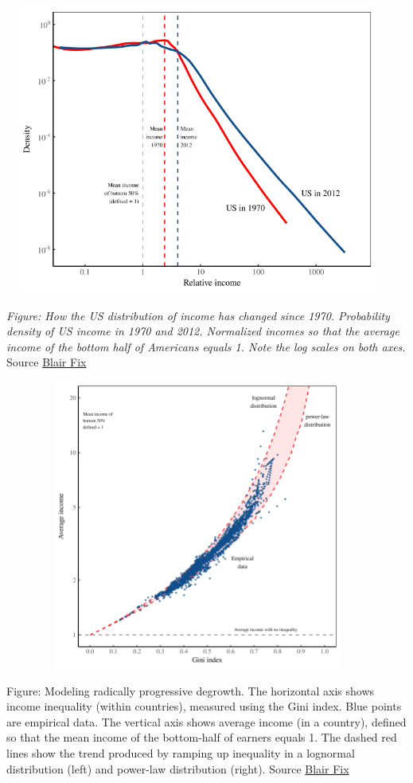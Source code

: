 \documentclass[
]{book}
\begin{document}
\includegraphics[width=5in,height=3.75in]{fig/fix_inequality.png}

\emph{Figure: How the US distribution of income has changed since 1970.
Probability density of US income in 1970 and 2012.
Normalized incomes so that the average income of the bottom half of Americans equals 1.
Note the log scales on both axes.}
Source \href{https://economicsfromthetopdown.com/2021/02/26/radically-progressive-degrowth-reducing-resource-use-by-eliminating-inequality/}{Blair Fix}

\includegraphics[width=5in,height=3.75in]{fig/fix_inequality_model.png}

Figure: Modeling radically progressive degrowth.
The horizontal axis shows income inequality (within countries), measured using the Gini index.
Blue points are empirical data.
The vertical axis shows average income (in a country),
defined so that the mean income of the bottom-half of earners equals 1.
The dashed red lines show the trend produced by ramping up inequality
in a lognormal distribution (left) and power-law distribution (right).
Source \href{https://economicsfromthetopdown.com/2021/02/26/radically-progressive-degrowth-reducing-resource-use-by-eliminating-inequality/}{Blair Fix}
\end{document}
